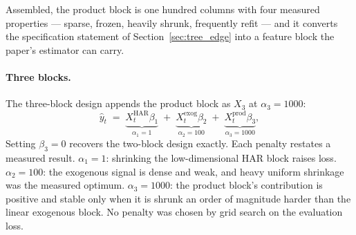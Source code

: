 Assembled, the product block is one hundred columns with four measured
properties --- sparse, frozen, heavily shrunk, frequently refit --- and it
converts the specification statement of Section~\ref{sec:tree_edge} into a
feature block the paper's estimator can carry.

\paragraph{Three blocks.}
The three-block design appends the product block as $X_3$ at
$\alpha_3 = 1000$:
\begin{equation}
    \hat{y}_t \;=\;
    \underbrace{X^{\mathrm{HAR}}_t \beta_1}_{\alpha_1 = 1}
    \;+\;
    \underbrace{X^{\mathrm{exog}}_t \beta_2}_{\alpha_2 = 100}
    \;+\;
    \underbrace{X^{\mathrm{prod}}_t \beta_3}_{\alpha_3 = 1000},
    \label{eq:three_block}
\end{equation}
Setting $\beta_3 = 0$ recovers the two-block design exactly. Each
penalty restates a measured result. $\alpha_1 = 1$: shrinking the
low-dimensional HAR block raises loss. $\alpha_2 = 100$: the
exogenous signal is dense and weak, and heavy uniform shrinkage was
the measured optimum. $\alpha_3 = 1000$: the product block's
contribution is positive and stable only when it is shrunk an order
of magnitude harder than the linear exogenous block. No penalty was
chosen by grid search on the evaluation loss.

